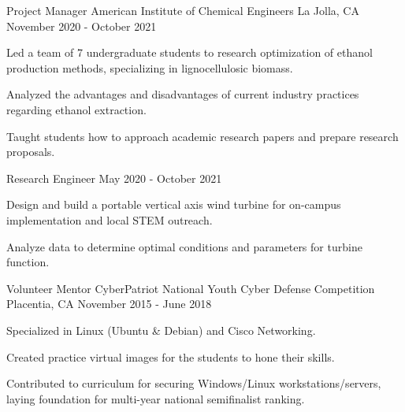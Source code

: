\begin{cventries}
\cventrytwo
{Project Manager} %
{American Institute of Chemical Engineers} %
{La Jolla, CA} %
{November 2020 - October 2021} %
{
    \begin{cvitems} %
        \item {Led a team of 7 undergraduate students to research optimization of ethanol production methods, specializing in lignocellulosic biomass.}
        \item {Analyzed the advantages and disadvantages of current industry practices regarding ethanol extraction.}
        \item {Taught students how to approach academic research papers and prepare research proposals.}
      \end{cvitems}
}
    {Research Engineer} %
    {May 2020 - October 2021} %
    {
        \begin{cvitems} %
            \item {Design and build a portable vertical axis wind turbine for on-campus implementation and local STEM outreach.}
            \item {Analyze data to determine optimal conditions and parameters for turbine function.}
        \end{cvitems}
    }
 \cventry
    {Volunteer Mentor} %
    {CyberPatriot National Youth Cyber Defense Competition} %
    {Placentia, CA} %
    {November 2015 - June 2018} %
    {
      \begin{cvitems} %
        \item {Specialized in Linux (Ubuntu \& Debian) and Cisco Networking.}
        \item {Created practice virtual images for the students to hone their skills.}
        \item {Contributed to curriculum for securing Windows/Linux workstations/servers, laying foundation for multi-year national semifinalist ranking.}

\end{cvitems}}
\end{cventries}
